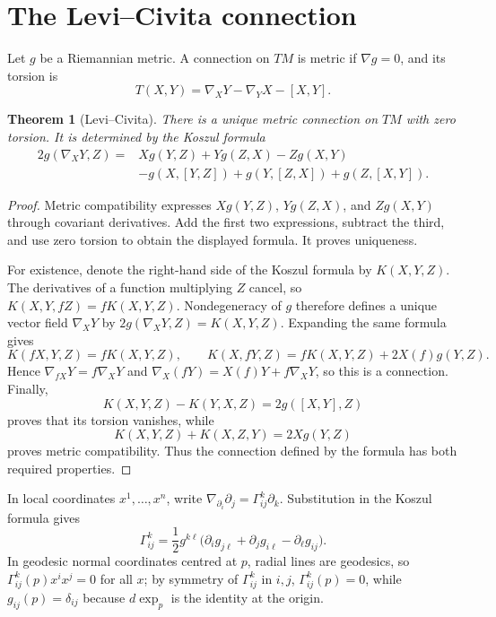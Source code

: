 \documentclass[11pt,oneside,reqno]{book}
\theoremstyle{plain}
\newtheorem{theorem}{Theorem}[chapter]
\theoremstyle{definition}
\theoremstyle{remark}
\begin{document}
\section{The Levi--Civita connection}

Let \(g\) be a Riemannian metric. A connection on \(TM\) is metric if
\(\nabla g=0\), and its torsion is
\[
 T(X,Y)=\nabla_XY-\nabla_YX-[X,Y].
\]

\begin{theorem}[Levi--Civita]
There is a unique metric connection on \(TM\) with zero torsion.
It is determined by the Koszul formula
\[
\begin{aligned}
 2g(\nabla_XY,Z)
 ={}&
 Xg(Y,Z)+Yg(Z,X)-Zg(X,Y)\\
 &-g(X,[Y,Z])+g(Y,[Z,X])+g(Z,[X,Y]).
\end{aligned}
\]
\end{theorem}

\begin{proof}
Metric compatibility expresses \(Xg(Y,Z)\), \(Yg(Z,X)\), and
\(Zg(X,Y)\) through covariant derivatives. Add the first two expressions,
subtract the third, and use zero torsion to obtain the displayed formula.
It proves uniqueness.

For existence, denote the right-hand side of the Koszul formula by
\(K(X,Y,Z)\).  The derivatives of a function multiplying \(Z\) cancel,
so \(K(X,Y,fZ)=fK(X,Y,Z)\).  Nondegeneracy of \(g\) therefore defines a
unique vector field \(\nabla_XY\) by
\(2g(\nabla_XY,Z)=K(X,Y,Z)\).  Expanding the same formula gives
\[
 K(fX,Y,Z)=fK(X,Y,Z),
 \qquad
 K(X,fY,Z)=fK(X,Y,Z)+2X(f)g(Y,Z).
\]
Hence \(\nabla_{fX}Y=f\nabla_XY\) and
\(\nabla_X(fY)=X(f)Y+f\nabla_XY\), so this is a connection.  Finally,
\[
 K(X,Y,Z)-K(Y,X,Z)=2g([X,Y],Z)
\]
proves that its torsion vanishes, while
\[
 K(X,Y,Z)+K(X,Z,Y)=2Xg(Y,Z)
\]
proves metric compatibility.  Thus the connection defined by the formula
has both required properties.
\end{proof}

In local coordinates \(x^1,\ldots,x^n\), write
\(\nabla_{\partial_i}\partial_j=\Gamma^k_{ij}\partial_k\).  Substitution
in the Koszul formula gives
\[
 \Gamma^k_{ij}
 =\frac12g^{k\ell}
 \bigl(\partial_i g_{j\ell}+\partial_j g_{i\ell}
       -\partial_\ell g_{ij}\bigr).
\]
In geodesic normal coordinates centred at \(p\), radial lines are
geodesics, so \(\Gamma^k_{ij}(p)x^ix^j=0\) for all \(x\); by symmetry of
\(\Gamma^k_{ij}\) in \(i,j\), \(\Gamma^k_{ij}(p)=0\), while
\(g_{ij}(p)=\delta_{ij}\) because \(d\exp_p\) is the identity at the
origin.
\end{document}
